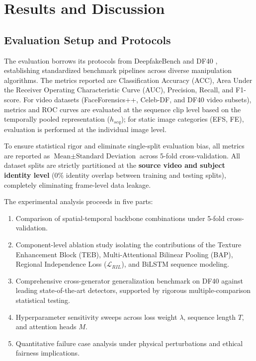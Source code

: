 \section{Results and Discussion}
\label{sec:results}

\subsection{Evaluation Setup and Protocols}
The evaluation borrows its protocols from DeepfakeBench \citep{Yan2023DeepfakeBench} and DF40 \citep{Yan2024DF40}, establishing standardized benchmark pipelines across diverse manipulation algorithms. The metrics reported are Classification Accuracy (ACC), Area Under the Receiver Operating Characteristic Curve (AUC), Precision, Recall, and F1-score. For video datasets (FaceForensics++, Celeb-DF, and DF40 video subsets), metrics and ROC curves are evaluated at the sequence clip level based on the temporally pooled representation ($h_{seq}$); for static image categories (EFS, FE), evaluation is performed at the individual image level.

To ensure statistical rigor and eliminate single-split evaluation bias, all metrics are reported as $\text{Mean} \pm \text{Standard Deviation}$ across 5-fold cross-validation. All dataset splits are strictly partitioned at the \textbf{source video and subject identity level} ($0\%$ identity overlap between training and testing splits), completely eliminating frame-level data leakage.

The experimental analysis proceeds in five parts:
\begin{enumerate}
    \item Comparison of spatial-temporal backbone combinations under 5-fold cross-validation.
    \item Component-level ablation study isolating the contributions of the Texture Enhancement Block (TEB), Multi-Attentional Bilinear Pooling (BAP), Regional Independence Loss ($\mathcal{L}_{RIL}$), and BiLSTM sequence modeling.
    \item Comprehensive cross-generator generalization benchmark on DF40 against leading state-of-the-art detectors, supported by rigorous multiple-comparison statistical testing.
    \item Hyperparameter sensitivity sweeps across loss weight $\lambda$, sequence length $T$, and attention heads $M$.
    \item Quantitative failure case analysis under physical perturbations and ethical fairness implications.
\end{enumerate}


